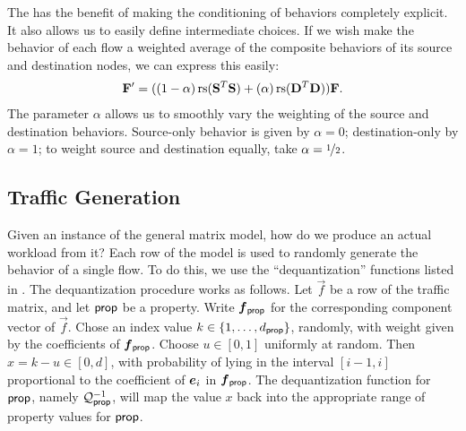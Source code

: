 \documentclass[twocolumn,final]{svjour3}
\begin{document}
The  has the benefit of making the conditioning of behaviors completely explicit. It also allows us to easily define intermediate choices. If we wish make the behavior of each flow a weighted average of the composite behaviors of its source and destination nodes, we can express this easily:
\begin{align}
\mathbf{F}' = ((1-\alpha)\,\text{rs}({\mathbf{S}}^T\mathbf{S})+(\alpha)\,\text{rs}({\mathbf{D}}^T\mathbf{D}))\mathbf{F}.
\end{align}
The parameter $\alpha$ allows us to smoothly vary the weighting of the source and destination behaviors. Source-only behavior is given by $\alpha=0$; destination-only by $\alpha=1$; to weight source and destination equally, take $\alpha=\nicefrac{1}{2}$.

\subsection{Traffic Generation}

Given an instance of the general matrix model, how do we produce an actual workload from it?
Each row of the model is used to randomly generate the behavior of a single flow.
To do this, we use the ``dequantization'' functions listed in .
The dequantization procedure works as follows.
Let $\vec{f}$
be a row of the traffic matrix, and let $\text{\textsf{prop}}$ be a property.
Write $\vec{f}_\prop$ for the corresponding component vector of $\vec{f}$.
Chose an index value $k\in{\left\{1,\dots,d_{\text{\textsf{prop}}}\right\}}$, randomly, with weight given by the coefficients of $\vec{f}_\prop$.
Choose $u \in [0,1]$ uniformly at random.
Then $x = k-u \in [0,d]$, with probability of lying in the interval $[i-1,i]$ proportional to the coefficient of $\e_i$ in $\vec{f}_\prop$.
The dequantization function for $\text{\textsf{prop}}$, namely $\mathcal{Q}^{-1}_{\text{\textsf{prop}}}$, will map the value $x$ back into the appropriate range of property values for $\text{\textsf{prop}}$.
\end{document}

